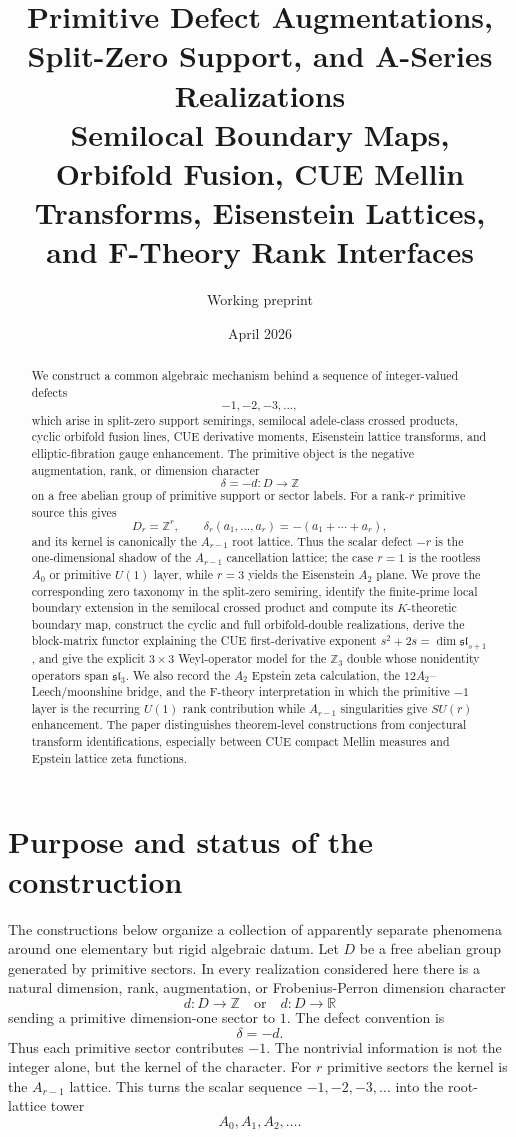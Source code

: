 \documentclass[11pt]{article}
\title{Primitive Defect Augmentations, Split-Zero Support, and A-Series Realizations\\
\large Semilocal Boundary Maps, Orbifold Fusion, CUE Mellin Transforms, Eisenstein Lattices, and F-Theory Rank Interfaces}
\author{Working preprint}
\date{April 2026}
\newcommand{\ZZ}{\mathbb Z}
\newcommand{\RR}{\mathbb R}
\begin{document}
\maketitle

\begin{abstract}
We construct a common algebraic mechanism behind a sequence of integer-valued defects
\[
        -1,-2,-3,\ldots,
\]
which arise in split-zero support semirings, semilocal adele-class crossed products, cyclic orbifold fusion lines, CUE derivative moments, Eisenstein lattice transforms, and elliptic-fibration gauge enhancement.  The primitive object is the negative augmentation, rank, or dimension character
\[
        \delta=-d:D\longrightarrow \ZZ
\]
on a free abelian group of primitive support or sector labels.  For a rank-$r$ primitive source this gives
\[
        D_r=\ZZ^r,\qquad \delta_r(a_1,\ldots,a_r)=-(a_1+\cdots+a_r),
\]
and its kernel is canonically the $A_{r-1}$ root lattice.  Thus the scalar defect $-r$ is the one-dimensional shadow of the $A_{r-1}$ cancellation lattice; the case $r=1$ is the rootless $A_0$ or primitive $U(1)$ layer, while $r=3$ yields the Eisenstein $A_2$ plane.  We prove the corresponding zero taxonomy in the split-zero semiring, identify the finite-prime local boundary extension in the semilocal crossed product and compute its $K$-theoretic boundary map, construct the cyclic and full orbifold-double realizations, derive the block-matrix functor explaining the CUE first-derivative exponent $s^2+2s=\dim\mathfrak{sl}_{s+1}$, and give the explicit $3\times 3$ Weyl-operator model for the $\ZZ_3$ double whose nonidentity operators span $\mathfrak{sl}_3$.  We also record the $A_2$ Epstein zeta calculation, the $12A_2$--Leech/moonshine bridge, and the F-theory interpretation in which the primitive $-1$ layer is the recurring $U(1)$ rank contribution while $A_{r-1}$ singularities give $SU(r)$ enhancement.  The paper distinguishes theorem-level constructions from conjectural transform identifications, especially between CUE compact Mellin measures and Epstein lattice zeta functions.
\end{abstract}

\tableofcontents

\section{Purpose and status of the construction}

The constructions below organize a collection of apparently separate phenomena around one elementary but rigid algebraic datum.  Let $D$ be a free abelian group generated by primitive sectors.  In every realization considered here there is a natural dimension, rank, augmentation, or Frobenius-Perron dimension character
\[
        d:D\to \ZZ\quad\text{or}\quad d:D\to\RR
\]
sending a primitive dimension-one sector to $1$.  The defect convention is
\[
        \delta=-d.
\]
Thus each primitive sector contributes $-1$.  The nontrivial information is not the integer alone, but the kernel of the character.  For $r$ primitive sectors the kernel is the $A_{r-1}$ lattice.  This turns the scalar sequence $-1,-2,-3,\ldots$ into the root-lattice tower
\[
        A_0,A_1,A_2,\ldots.
\]
\end{document}
